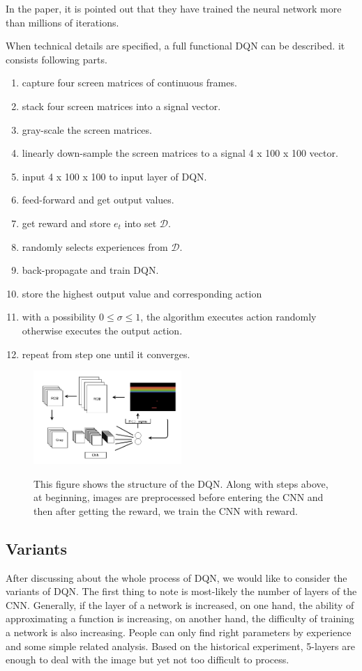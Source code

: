 \documentclass{article}
\begin{document}
In the paper, it is pointed out that they have trained the neural network more than millions of iterations. 

When technical details are specified, a full functional DQN can be described. it consists following parts.

\begin{enumerate}
\item capture four screen matrices of continuous frames.
\item stack four screen matrices into a signal vector.
\item gray-scale the screen matrices.
\item linearly down-sample the screen matrices to a signal 4 x 100 x 100 vector.
\item input 4 x 100 x 100 to input layer of DQN.
\item feed-forward and get output values.
\item get reward and store $e_t$ into set $\mathcal{D}$.
\item randomly selects experiences from  $\mathcal{D}$.
\item back-propagate and train DQN.
\item store the highest output value and corresponding action
\item with a possibility $0 \leq \sigma \leq 1$, the algorithm executes action randomly otherwise executes the output action.
\item repeat from step one until it converges.
\end{enumerate}
\begin{figure}[H]
\centering
{\includegraphics[width = 0.5\textwidth]{dqn}} 
\caption{This figure shows the structure of the DQN. Along with steps above, at beginning, images are preprocessed before entering the CNN and then after getting the reward,  we train the CNN with reward.}\label{dqn}
\end{figure}

\subsection{Variants}
After discussing about the whole process of DQN, we would like to consider the variants of DQN. The first thing to note is most-likely the number of layers of the CNN. Generally, if the layer of a network is increased, on one hand, the ability of approximating a function is increasing, on another hand, the difficulty of training a network is also increasing. People can only find right parameters by experience and some simple related analysis. Based on the historical experiment, 5-layers are enough to deal with the image but yet not too difficult to process. 
\end{document}
